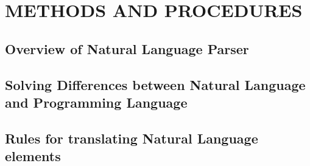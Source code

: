 \chapter{METHODS AND PROCEDURES}
\section{Overview of Natural Language Parser}
\section{Solving Differences between Natural Language and Programming Language}
\section{Rules for translating Natural Language elements}




